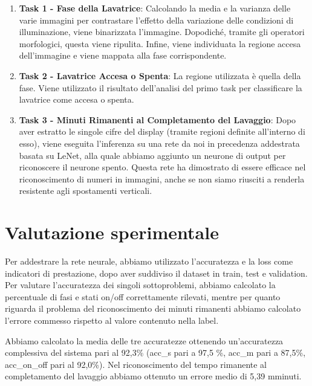 \documentclass{article}
\begin{document}
\begin{enumerate}
\item
  \textbf{Task 1 - Fase della Lavatrice}: Calcolando la media e la
  varianza delle varie immagini per contrastare l'effetto della
  variazione delle condizioni di illuminazione, viene binarizzata
  l'immagine. Dopodiché, tramite gli operatori morfologici, questa viene
  ripulita. Infine, viene individuata la regione accesa dell'immagine e
  viene mappata alla fase corrispondente.
\item
  \textbf{Task 2 - Lavatrice Accesa o Spenta}: La regione utilizzata è
  quella della fase. Viene utilizzato il risultato dell'analisi del
  primo task per classificare la lavatrice come accesa o spenta.
\item
  \textbf{Task 3 - Minuti Rimanenti al Completamento del Lavaggio}: Dopo
  aver estratto le singole cifre del display (tramite regioni definite
  all'interno di esso), viene eseguita l'inferenza su una rete da noi in
  precedenza addestrata basata su LeNet, alla quale abbiamo aggiunto un
  neurone di output per riconoscere il neurone spento. Questa rete ha
  dimostrato di essere efficace nel riconoscimento di numeri in
  immagini, anche se non siamo riusciti a renderla resistente agli
  spostamenti verticali.
\end{enumerate}

\section{Valutazione sperimentale}\label{valutazione-sperimentale}

\par Per addestrare la rete neurale, abbiamo utilizzato l'accuratezza e la
loss come indicatori di prestazione, dopo aver suddiviso il dataset in
train, test e validation. Per valutare l'accuratezza dei singoli
sottoproblemi, abbiamo calcolato la percentuale di fasi e stati on/off
correttamente rilevati, mentre per quanto riguarda il problema del
riconoscimento dei minuti rimanenti abbiamo calcolato l'errore commesso
rispetto al valore contenuto nella label.

\par Abbiamo calcolato la media delle tre accuratezze ottenendo
un'accuratezza complessiva del sistema pari al 92,3\% (acc\_s pari a 97,5
\%, acc\_m pari a 87,5\%, acc\_on\_off pari al 92,0\%). Nel riconoscimento del tempo rimanente al completamento del lavaggio abbiamo ottenuto un errore medio di 5,39 mminuti. 
\end{document}
